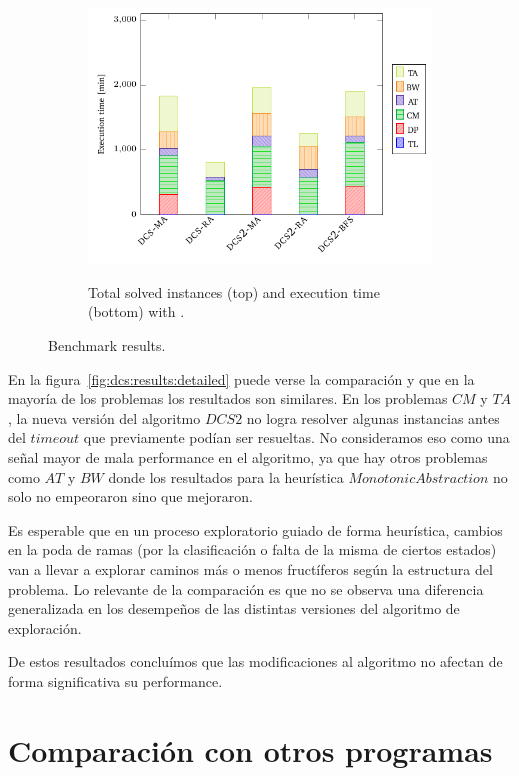 \begin{figure}[th]
\begin{subfigure}{0.5\textwidth}
        \includegraphics[width=\linewidth]{figures/benchmark/dcs_time.pdf}\label{fig:dcs:results:time}
        \caption{Total solved instances (top) and execution time (bottom) with \DCS.}
    \end{subfigure}
\caption{Benchmark results.}
\label{fig:dcs:results}
\end{figure}


En la figura~\ref{fig:dcs:results:detailed} puede verse la comparación y que en la mayoría de los problemas los resultados son similares. En los problemas $CM$ y $TA$, la nueva versión del algoritmo $DCS2$ no logra resolver algunas instancias antes del $timeout$ que previamente podían ser resueltas. No consideramos eso como una señal mayor de mala performance en el algoritmo, ya que hay otros problemas como $AT$ y $BW$ donde los resultados para la heurística $Monotonic Abstraction$ no solo no empeoraron sino que mejoraron.

Es esperable que en un proceso exploratorio guiado de forma heurística, cambios en la poda de ramas (por la clasificación o falta de la misma de ciertos estados) van a llevar a explorar caminos más o menos fructíferos según la estructura del problema. Lo relevante de la comparación es que no se observa una diferencia generalizada en los desempeños de las distintas versiones del algoritmo de exploración.

De estos resultados concluímos que las modificaciones al algoritmo no afectan de forma significativa su performance.

\section{Comparación con otros programas}

